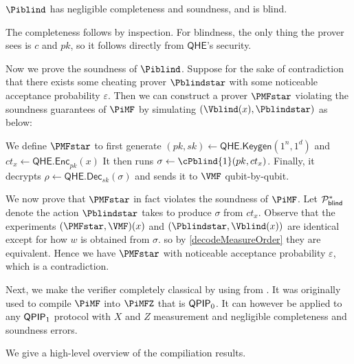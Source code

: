 \begin{thm}
	\label{thm:BlindBQP}
	$\Piblind$ has negligible completeness and soundness, and is blind.
\end{thm}
\begin{prf}
	The completeness follows by inspection.
	For blindness, the only thing the prover sees is $c$ and $pk$, so it follows directly from $\mathsf{QHE}$'s security.
	
	Now we prove the soundness of $\Piblind$.
	Suppose for the sake of contradiction that there exists some cheating prover $\Pblindstar$ with some noticeable acceptance probability $\varepsilon$.
	Then we can construct a prover $\PMFstar$ violating the soundness guarantees of $\PiMF$ by simulating $(\Vblind(x), \Pblindstar)$ as below:

	We define $\PMFstar$ to first generate
	$(pk, sk)\leftarrow\mathsf{QHE.Keygen}(1^n, 1^d)$
	and
	$ct_x\leftarrow\mathsf{QHE.Enc}_{pk}(x)$
	It then runs $\sigma\leftarrow\cPblind{1}(pk, ct_x)$.
	Finally, it decrypts
	$\rho\leftarrow\mathsf{QHE.Dec}_{sk}(\sigma)$
	and sends it to $\VMF$ qubit-by-qubit.

	We now prove that $\PMFstar$ in fact violates the soundness of $\PiMF$.
	Let $\mathcal{P}_{\mathsf{blind}}^*$ denote the action $\Pblindstar$ takes to produce $\sigma$ from $ct_x$.
	Observe that the experiments $(\PMFstar, \VMF)(x)$ and $(\Pblindstar, \Vblind(x))$ are identical except for how $w$ is obtained from $\sigma$.
	so by \cref{decodeMeasureOrder} they are equivalent.
	Hence we have $\PMFstar$ with noticeable acceptance probability $\varepsilon$, which is a contradiction.
\end{prf}


Next, we make the verifier completely classical by using  from \cite{FOCS:Mahadev18a}.
It was originally used to compile $\PiMF$ into $\PiMFZ$ that is $\operatorname{\mathsf{QPIP}}_0$. 
It can however be applied to any $\operatorname{\mathsf{QPIP}}_1$ protocol with $X$ and $Z$ measurement and negligible completeness and soundness errors.

We give a high-level overview of the compiliation results.

